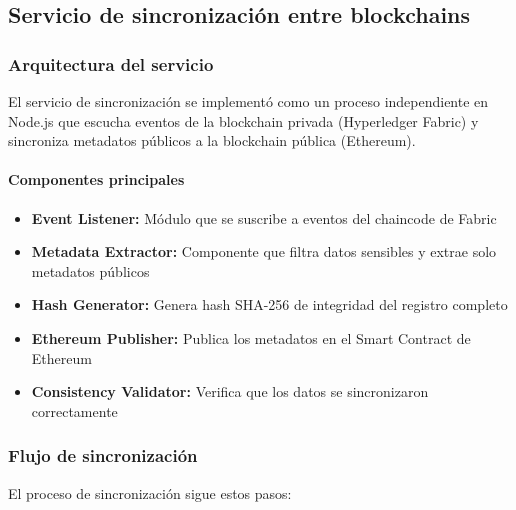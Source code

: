 \subsection{Servicio de sincronización entre blockchains}

\subsubsection{Arquitectura del servicio}

El servicio de sincronización se implementó como un proceso independiente en Node.js que escucha eventos de la blockchain privada (Hyperledger Fabric) y sincroniza metadatos públicos a la blockchain pública (Ethereum).

\paragraph{Componentes principales}
\begin{itemize}
    \item \textbf{Event Listener:} Módulo que se suscribe a eventos del chaincode de Fabric
    \item \textbf{Metadata Extractor:} Componente que filtra datos sensibles y extrae solo metadatos públicos
    \item \textbf{Hash Generator:} Genera hash SHA-256 de integridad del registro completo
    \item \textbf{Ethereum Publisher:} Publica los metadatos en el Smart Contract de Ethereum
    \item \textbf{Consistency Validator:} Verifica que los datos se sincronizaron correctamente
\end{itemize}

\subsubsection{Flujo de sincronización}

El proceso de sincronización sigue estos pasos:

